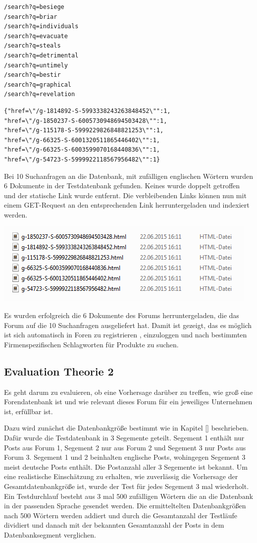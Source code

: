 \begin{lstlisting}[language=HTML5]
/search?q=besiege
/search?q=briar
/search?q=individuals
/search?q=evacuate
/search?q=steals
/search?q=detrimental
/search?q=untimely
/search?q=bestir
/search?q=graphical
/search?q=revelation
\end{lstlisting}

\begin{lstlisting}[language=HTML5]
{"href=\"/g-1814892-S-5993338243263848452\"":1,
"href=\"/g-1850237-S-6005730948694503428\"":1,
"href=\"/g-115178-S-5999229826848821253\"":1,
"href=\"/g-66325-S-6001320511865446402\"":1,
"href=\"/g-66325-S-6003599070168440836\"":1,
"href=\"/g-54723-S-5999922118567956482\"":1}
\end{lstlisting}

Bei 10 Suchanfragen an die Datenbank, mit zufälligen englischen Wörtern wurden 6 Dokumente in der Testdatenbank gefunden. Keines wurde doppelt getroffen und der statische Link wurde entfernt. Die verbleibenden Links können nun mit einem GET-Request an den entsprechenden Link herruntergeladen und indexiert werden.

\includegraphics{./images/postdownload.png}

Es wurden erfolgreich die 6 Dokumente des Forums herruntergeladen, die das Forum auf die 10 Suchanfragen ausgeliefert hat.
Damit ist gezeigt, das es möglich ist sich automatisch in Foren zu registrieren , einzuloggen und nach bestimmten Firmenspezifischen Schlagworten für Produkte zu suchen.

\subsection{Evaluation Theorie 2}

Es geht darum zu evaluieren, ob eine Vorhersage darüber zu treffen, wie groß eine Forendatenbank ist und wie relevant dieses Forum für ein jeweiliges Unternehmen ist, erfüllbar ist.

Dazu wird zunächst die Datenbankgröße bestimmt wie in Kapitel [] beschrieben. Dafür wurde die Testdatenbank in 3 Segemente geteilt. Segement 1 enthält nur Posts aus Forum 1, Segement 2 nur aus Forum 2 und Segement 3 nur Posts aus Forum 3. 
Segement 1 und 2 beinhalten englische Posts, wohingegen Segement 3 meist deutsche Posts enthält. Die Postanzahl aller 3 Segemente ist bekannt. Um eine realistische Einschätzung zu erhalten, wie zuverlässig die Vorhersage der Gesamtdatenbankgröße ist, wurde der Test für jedes Segement 3 mal wiederholt. Ein Testdurchlauf besteht aus 3 mal 500 zufälligen Wörtern die an die Datenbank in der passenden Sprache gesendet werden. Die ermitteltelten Datenbankgrößen nach 500 Wörtern werden addiert und durch die Gesamtanzahl der Testläufe dividiert und danach mit der bekannten Gesamtanzahl der Posts in dem Datenbanksegment verglichen.

